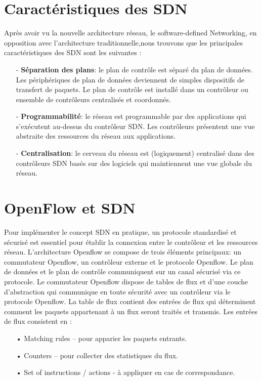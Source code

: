 \section{Caractéristiques des SDN}
Après avoir vu la nouvelle architecture réseau, le software-defined Networking, en opposition avec l'architecture traditionnelle,nous trouvons que les principales caractéristiques des SDN sont les suivantes :\\
\begin{itemize}
\item[-]\textbf{Séparation des plans}: le plan de contrôle est séparé du plan de données. Les périphériques de plan de données deviennent de simples dispositifs de transfert de paquets. Le plan de contrôle est installé dans un contrôleur ou ensemble de contrôleurs centralisés et coordonnés.\\
\item[-]\textbf{Programmabilité}: le réseau est programmable par des applications qui s’exécutent au-dessus du contrôleur SDN. Les contrôleurs présentent une vue abstraite des ressources du réseau aux applications.\\
\item[-]\textbf{Centralisation}: le cerveau du réseau est (logiquement) centralisé dans des contrôleurs SDN basés sur des logiciels qui maintiennent une vue globale du réseau.
\end{itemize}

\section{OpenFlow et SDN}
\label{S_OpenFlow}
Pour implémenter le concept SDN en pratique, un protocole standardisé et sécurisé est essentiel  pour établir la connexion entre le contrôleur et les ressources réseau. L’architecture Openflow se compose de trois éléments principaux: un commutateur Openflow, un contrôleur externe et le protocole Openflow. Le plan de données et le plan de contrôle communiquent sur un canal sécurisé via ce protocole. Le commutateur Openflow dispose de tables de flux et d’une couche d’abstraction qui communique en toute sécurité avec un contrôleur via le protocole Openflow. La table de flux contient des entrées de flux qui déterminent comment les paquets appartenant à un flux seront traités et transmis. 
Les entrées de flux consistent en :\\

\begin{itemize}
\item[•] Matching rules – pour apparier les paquets entrants.
\item[•] Counters – pour collecter des statistiques du flux.
\item[•] Set of instructions / actions - à appliquer en cas de correspondance.\\
\end{itemize}

